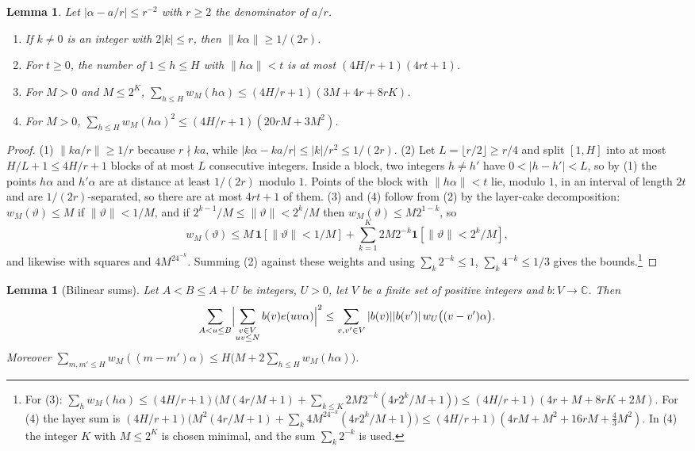 \documentclass[11pt]{amsart}
\newtheorem{lemma}[theorem]{Lemma}
\theoremstyle{definition}
\theoremstyle{remark}
\numberwithin{equation}{section}
\newcommand{\e}{e}
\newcommand{\nint}[1]{\|#1\|}
\begin{document}
\begin{lemma}\label{lem:spacing}
Let $|\alpha-a/r|\le r^{-2}$ with $r\ge2$ the denominator of $a/r$.
\begin{enumerate}
\item If $k\ne0$ is an integer with $2|k|\le r$, then $\nint{k\alpha}\ge1/(2r)$.
\item For $t\ge0$, the number of $1\le h\le H$ with $\nint{h\alpha}<t$ is at most
$(4H/r+1)(4rt+1)$.
\item For $M>0$ and $M\le2^K$, $\sum_{h\le H}w_M(h\alpha)\le(4H/r+1)(3M+4r+8rK)$.
\item For $M>0$, $\sum_{h\le H}w_M(h\alpha)^2\le(4H/r+1)(20rM+3M^2)$.
\end{enumerate}
\end{lemma}

\begin{proof}
(1) $\nint{ka/r}\ge1/r$ because $r\nmid ka$, while $|k\alpha-ka/r|\le|k|/r^2\le1/(2r)$.
(2) Let $L=\lfloor r/2\rfloor\ge r/4$ and split $[1,H]$ into at most
$H/L+1\le4H/r+1$ blocks of at most $L$ consecutive integers. Inside a block, two integers $h\ne h'$ have
$0<|h-h'|<L$, so by (1) the points $h\alpha$ and $h'\alpha$ are at distance at
least $1/(2r)$ modulo $1$. Points of the block with $\nint{h\alpha}<t$ lie, modulo
$1$, in an interval of length $2t$ and are $1/(2r)$-separated, so there are at
most $4rt+1$ of them.
(3) and (4) follow from (2) by the layer-cake decomposition: $w_M(\vartheta)\le M$
if $\nint\vartheta<1/M$, and if $2^{k-1}/M\le\nint\vartheta<2^k/M$ then
$w_M(\vartheta)\le M2^{1-k}$, so
\[
w_M(\vartheta)\le M\,\mathbf 1[\nint\vartheta<1/M]+\sum_{k=1}^K2M2^{-k}\mathbf 1[\nint\vartheta<2^k/M],
\]
and likewise with squares and $4M^24^{-k}$. Summing (2) against these weights
and using $\sum_k2^{-k}\le1$, $\sum_k4^{-k}\le1/3$ gives the bounds.\footnote{For
(3): $\sum_h w_M(h\alpha)\le(4H/r+1)\bigl(M(4r/M+1)+\sum_{k\le K}2M2^{-k}(4r2^k/M+1)\bigr)\le
(4H/r+1)(4r+M+8rK+2M)$. For (4) the layer sum is
$(4H/r+1)\bigl(M^2(4r/M+1)+\sum_k4M^24^{-k}(4r2^k/M+1)\bigr)\le(4H/r+1)(4rM+M^2+16rM+\tfrac43M^2)$.
In (4) the integer $K$ with $M\le2^K$ is chosen minimal, and the sum
$\sum_k2^{-k}$ is used.}
\end{proof}

\begin{lemma}[Bilinear sums]\label{lem:bilinear}
Let $A<B\le A+U$ be integers, $U>0$, let $V$ be a finite set of positive integers
and $b:V\to\mathbb C$. Then
\[
\sum_{A<u\le B}\Bigl|\sum_{\substack{v\in V\\ uv\le N}}b(v)\e(uv\alpha)\Bigr|^2\le\sum_{v,v'\in
V}|b(v)||b(v')|\,w_U\bigl((v-v')\alpha\bigr).
\]
Moreover $\sum_{m,m'\le H}w_M((m-m')\alpha)\le H\bigl(M+2\sum_{h\le H}w_M(h\alpha)\bigr)$.
\end{lemma}
\end{document}

